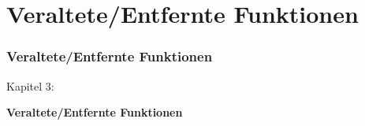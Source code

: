 %

\section{Veraltete/Entfernte Funktionen}
\begin{frame}[fragile]
	\frametitle{Veraltete/Entfernte Funktionen}

	\begin{center}\huge{Kapitel 3:}\end{center}
	\begin{center}\huge{\color{typo3darkgrey}\textbf{Veraltete/Entfernte Funktionen}}\end{center}

\end{frame}


